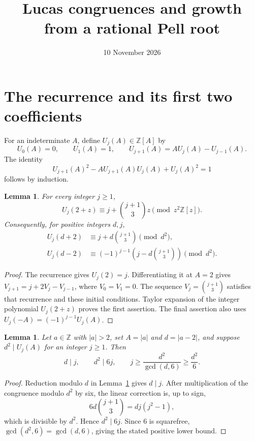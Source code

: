 \documentclass[11pt,a4paper]{article}
\title{Lucas congruences and growth from a rational Pell root}
\author{}\date{10 November 2026}
\newtheorem{lemma}[theorem]{Lemma}
\newcommand{\Z}{\mathbb Z}\newcommand{\Q}{\mathbb Q}
\begin{document}
\maketitle

\section{The recurrence and its first two coefficients}
For an indeterminate $A$, define $U_j(A)\in\Z[A]$ by
\[
 U_0(A)=0,\qquad U_1(A)=1,\qquad
 U_{j+1}(A)=AU_j(A)-U_{j-1}(A).
\]
The identity
\begin{equation}\label{eq:pell}
 U_{j+1}(A)^2-AU_{j+1}(A)U_j(A)+U_j(A)^2=1
\end{equation}
follows by induction.

\begin{lemma}\label{lem:expansion}
For every integer $j\ge1$,
\[
 U_j(2+z)\equiv j+\binom{j+1}{3}z\pmod{z^2\Z[z]}.
\]
Consequently, for positive integers $d,j$,
\begin{align*}
 U_j(d+2)&\equiv j+d\binom{j+1}{3}\pmod{d^2},\\
 U_j(d-2)&\equiv(-1)^{j-1}
                 \left(j-d\binom{j+1}{3}\right)\pmod{d^2}.
\end{align*}
\end{lemma}
\begin{proof}
The recurrence gives $U_j(2)=j$. Differentiating it at $A=2$
gives $V_{j+1}=j+2V_j-V_{j-1}$, where $V_0=V_1=0$.
The sequence $V_j=\binom{j+1}{3}$ satisfies that recurrence and
these initial conditions. Taylor expansion of the integer polynomial
$U_j(2+z)$ proves the first assertion. The final assertion also uses
$U_j(-A)=(-1)^{j-1}U_j(A)$.
\end{proof}

\begin{lemma}\label{lem:index}
Let $a\in\Z$ with $|a|>2$, set $A=|a|$ and $d=|a-2|$,
and suppose $d^2\mid U_j(A)$ for an integer $j\ge1$. Then
\[
 d\mid j,\qquad d^2\mid6j,\qquad
 j\ge\frac{d^2}{\gcd(d,6)}\ge\frac{d^2}{6}.
\]
\end{lemma}
\begin{proof}
Reduction modulo $d$ in Lemma~\ref{lem:expansion} gives $d\mid j$.
After multiplication of the congruence modulo $d^2$ by six, the
linear correction is, up to sign,
\[
              6d\binom{j+1}{3}=dj(j^2-1),
\]
which is divisible by $d^2$. Hence $d^2\mid6j$.
Since $6$ is squarefree, $\gcd(d^2,6)=\gcd(d,6)$, giving the
stated positive lower bound.
\end{proof}
\end{document}
